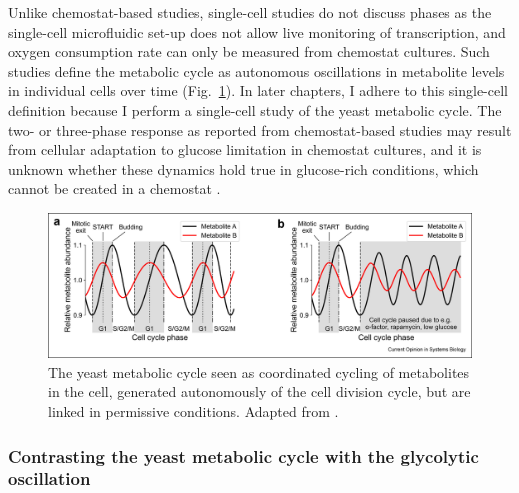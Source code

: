 Unlike chemostat-based studies, single-cell studies do not discuss phases as the single-cell microfluidic set-up does not allow live monitoring of transcription, and oxygen consumption rate can only be measured from chemostat cultures.
Such studies define the metabolic cycle as autonomous oscillations in metabolite levels in individual cells over time (Fig.\ \ref{fig:intro-ymc-overview-ss}).
In later chapters, I adhere to this single-cell definition because I perform a single-cell study of the yeast metabolic cycle.
The two- or three-phase response as reported from chemostat-based studies may result from cellular adaptation to glucose limitation in chemostat cultures, and it is unknown whether these dynamics hold true in glucose-rich conditions, which cannot be created in a chemostat \parencite{slavovCouplingGrowthRate2011}.

\begin{figure}[h!]
  \centering
  \includegraphics[width=1.0\textwidth]{zylstraMetabolicDynamicsCell2022_1}
  \caption[
    The yeast metabolic cycle seen as coordinated cycling of metabolites in the cell
  ]{
    The yeast metabolic cycle seen as coordinated cycling of metabolites in the cell, generated autonomously of the cell division cycle, but are linked in permissive conditions.
    Adapted from \textcite{zylstraMetabolicDynamicsCell2022}.}
  \label{fig:intro-ymc-overview-ss}
\end{figure}


\subsubsection{Contrasting the yeast metabolic cycle with the glycolytic oscillation}
\label{subsubsec:intro-ymc-definition-vsglycolytic}

